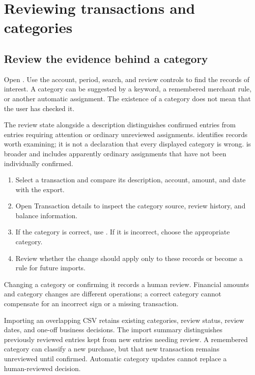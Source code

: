 \chapter{Reviewing transactions and categories}\label{ch:transactions}
\section{Review the evidence behind a category}
Open . Use the account, period, search, and review controls to find the records of interest. A category can be suggested by a keyword, a remembered merchant rule, or another automatic assignment. The existence of a category does not mean that the user has checked it.

The review state alongside a description distinguishes confirmed entries from entries requiring attention or ordinary unreviewed assignments.  identifies records worth examining; it is not a declaration that every displayed category is wrong.  is broader and includes apparently ordinary assignments that have not been individually confirmed.

\begin{enumerate}
\item Select a transaction and compare its description, account, amount, and date with the export.
\item Open Transaction details to inspect the category source, review history, and balance information.
\item If the category is correct, use . If it is incorrect, choose the appropriate category.
\item Review whether the change should apply only to these records or become a rule for future imports.
\end{enumerate}

Changing a category or confirming it records a human review. Financial amounts and category changes are different operations; a correct category cannot compensate for an incorrect sign or a missing transaction.

Importing an overlapping CSV retains existing categories, review status, review dates, and one-off business decisions. The import summary distinguishes previously reviewed entries kept from new entries needing review. A remembered category can classify a new purchase, but that new transaction remains unreviewed until confirmed. Automatic category updates cannot replace a human-reviewed decision.

